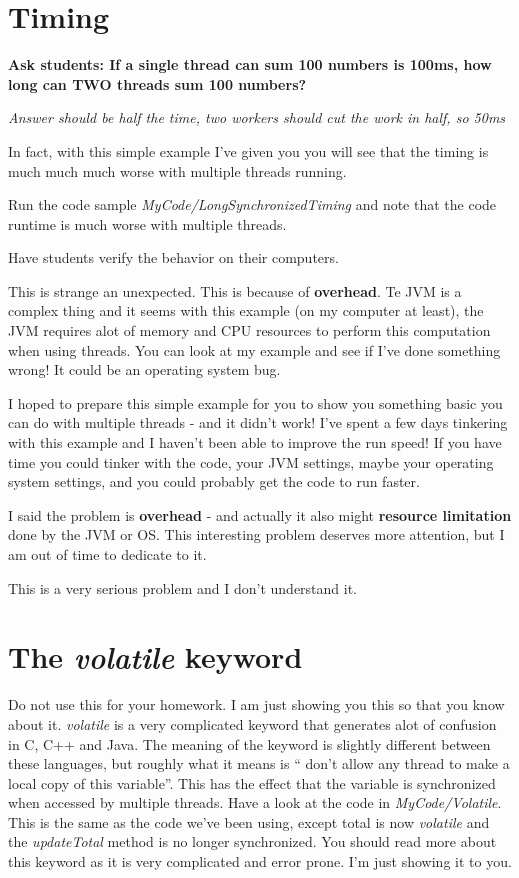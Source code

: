 \documentclass[12pt]{article}
\begin{document}
\section{Timing}
{\Large \textbf{Ask students: If a single thread can sum 100 numbers is 100ms,
how long can TWO threads sum 100 numbers?}}

{\Large \textit{Answer should be half the time, two workers should cut the work
in half, so 50ms}}

In fact, with this simple example I've given you you will see that the timing is
much much much worse with multiple threads running. 

Run the code sample \textit{MyCode/LongSynchronizedTiming} and note that the
code runtime is much worse with multiple threads.

Have students verify the behavior on their computers.

This is strange an unexpected. This is because of \textbf{overhead}. Te JVM is a
complex thing and it seems with this example (on my computer at least), the JVM
requires alot of memory and CPU resources to perform this computation when using
threads. You can look at my example and see if I've done something wrong! It
could be an operating system bug. 

I hoped to prepare this simple example for you to show you something basic you
can do with multiple threads - and it didn't work! I've spent a few days
tinkering with this example and I haven't been able to improve the run speed! If
you have time you could tinker with the code, your JVM settings, maybe your
operating system settings, and you could probably get the code to run faster. 

I said the problem is \textbf{overhead} - and actually it also might
\textbf{resource limitation} done by the JVM or OS. This interesting problem
deserves more attention, but I am out of time to dedicate to it.

This is a very serious problem and I don't understand it.

\section{The \textit{volatile} keyword}
Do not use this for your homework. I am just showing you this so that you know
about it. \textit{volatile} is a very complicated keyword that generates alot of
confusion in C, C++ and Java. The meaning of the keyword is slightly different
between these languages, but roughly what it means is `` don't allow any thread
to make a local copy of this variable''. This has the effect that the variable
is synchronized when accessed by multiple threads. Have a look at the code in 
\textit{MyCode/Volatile}. This is the same as the code we've been using, except
total is now \textit{volatile} and the \textit{updateTotal} method is no longer
synchronized. You should read more about this keyword as it is very complicated
and error prone. I'm just showing it to you.
\end{document}
